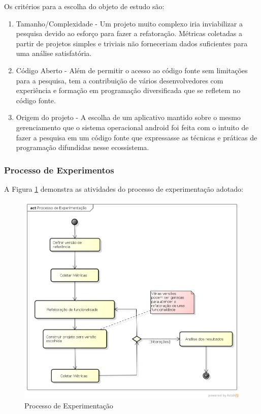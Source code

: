 \documentclass[conference]{IEEEtran}
\begin{document}
Os critérios para a escolha do objeto de estudo são:

\begin{enumerate}
  \item Tamanho/Complexidade - Um projeto muito complexo iria inviabilizar a
  pesquisa devido ao esforço para fazer a refatoração. Métricas coletadas
  a partir de projetos simples e triviais não forneceriam dados suficientes para
  uma análise satisfatória.
  \item Código Aberto - Além de permitir o acesso ao código fonte sem
  limitações para a pesquisa, tem a contribuição de vários desenvolvedores com
  experiência e formação em programação diversificada que se refletem no código fonte.
  \item Origem do projeto - A escolha de um aplicativo mantido sobre o mesmo
  gerenciamento que o sistema operacional android foi feita com o intuito de
  fazer a pesquisa em um código fonte que expressasse as técnicas e práticas de
  programação difundidas nesse ecossistema.
\end{enumerate}

\subsubsection{Processo de Experimentos}


A Figura \ref{processo_experimentacao} demonstra as atividades do processo de
experimentação adotado:
\begin{figure}[!htb]
	\begin{center}
	\includegraphics[scale=0.35]{img/processo_experimentacao.png}
	\end{center}
	
	\caption{\label{processo_experimentacao} Processo de Experimentação}
\end{figure}
\end{document}
